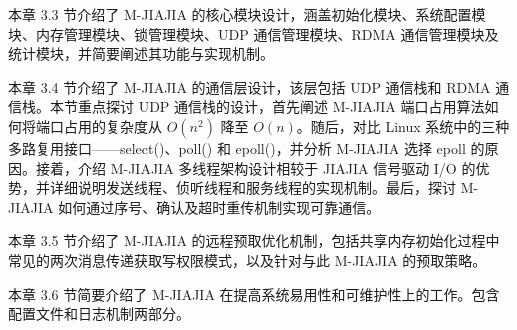 {本章 3.3 节介绍了 M-JIAJIA 的核心模块设计，涵盖初始化模块、系统配置模块、内存管理模块、锁管理模块、UDP 通信管理模块、RDMA 通信管理模块及统计模块，并简要阐述其功能与实现机制。

本章 3.4 节介绍了 M-JIAJIA 的通信层设计，该层包括 UDP 通信栈和 RDMA 通信栈。本节重点探讨 UDP 通信栈的设计，首先阐述 M-JIAJIA 端口占用算法如何将端口占用的复杂度从 $O(n^2)$ 降至 $O(n)$。随后，对比 Linux 系统中的三种多路复用接口——select()、poll() 和 epoll()，并分析 M-JIAJIA 选择 epoll 的原因。接着，介绍 M-JIAJIA 多线程架构设计相较于 JIAJIA 信号驱动 I/O 的优势，并详细说明发送线程、侦听线程和服务线程的实现机制。最后，探讨 M-JIAJIA 如何通过序号、确认及超时重传机制实现可靠通信。

本章 3.5 节介绍了 M-JIAJIA 的远程预取优化机制，包括共享内存初始化过程中常见的两次消息传递获取写权限模式，以及针对与此 M-JIAJIA 的预取策略。

本章 3.6 节简要介绍了 M-JIAJIA 在提高系统易用性和可维护性上的工作。包含配置文件和日志机制两部分。

}
